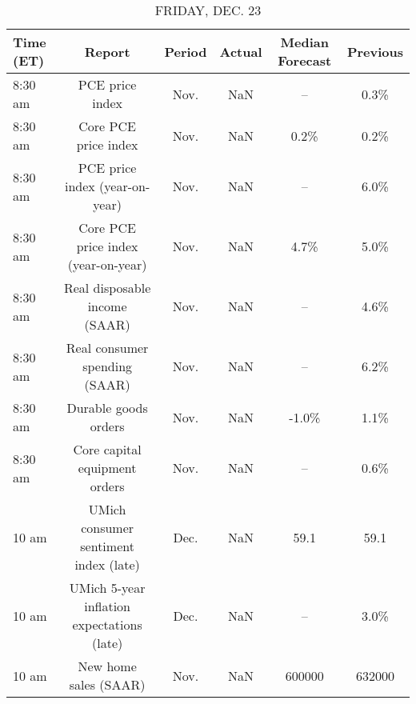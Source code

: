 \documentclass{article}%
\begin{document}
\begin{table}[htbp]%
\caption{FRIDAY, DEC. 23}%
\centering%
\begin{adjustbox}{width=1\textwidth}%
\begin{tabular}{lccccc}
\toprule
Time (ET) &                                     Report & Period & Actual & Median Forecast & Previous \\
\midrule
  8:30 am &                            PCE price index &   Nov. &    NaN &              -- &     0.3\% \\
  8:30 am &                       Core PCE price index &   Nov. &    NaN &            0.2\% &     0.2\% \\
  8:30 am &             PCE price index (year-on-year) &   Nov. &    NaN &              -- &     6.0\% \\
  8:30 am &        Core PCE price index (year-on-year) &   Nov. &    NaN &            4.7\% &     5.0\% \\
  8:30 am &              Real disposable income (SAAR) &   Nov. &    NaN &              -- &     4.6\% \\
  8:30 am &              Real consumer spending (SAAR) &   Nov. &    NaN &              -- &     6.2\% \\
  8:30 am &                       Durable goods orders &   Nov. &    NaN &           -1.0\% &     1.1\% \\
  8:30 am &              Core capital equipment orders &   Nov. &    NaN &              -- &     0.6\% \\
    10 am &      UMich consumer sentiment index (late) &   Dec. &    NaN &            59.1 &     59.1 \\
    10 am & UMich 5-year inflation expectations (late) &   Dec. &    NaN &              -- &     3.0\% \\
    10 am &                      New home sales (SAAR) &   Nov. &    NaN &          600000 &   632000 \\
\bottomrule
\end{tabular}
%
\end{adjustbox}%
\end{table}
\end{document}
